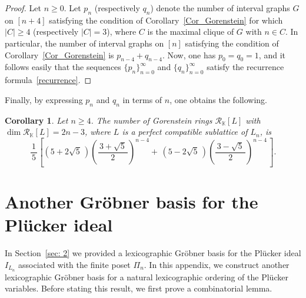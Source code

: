 \documentclass[12pt,a4paper]{amsart}
\def\Rc{{\mathcal R}}
\newtheorem{Corollary}[Theorem]{Corollary}
\theoremstyle{definition}
\begin{document}
\begin{proof}
Let $n \geq 0$.
Let $p_n$ (respectively $q_n$) denote the number of interval graphs $G$ on
$[n+4]$ satisfying the condition of Corollary~\ref{Cor_Gorenstein} for which
$|C| \geq 4$ (respectively $|C| = 3$), where $C$ is the maximal clique of $G$
with $n \in C$.
In particular, the number of interval graphs on $[n]$ satisfying the
condition of Corollary~\ref{Cor_Gorenstein} is $p_{n-4} + q_{n-4}$.
Now, one has $p_0 = q_0 = 1$, and it follows easily that the sequences
$\{p_n\}_{n=0}^\infty$ and $\{q_n\}_{n=0}^\infty$ satisfy the recurrence
formula~\eqref{recurrence}.
\end{proof}

Finally, by expressing $p_n$ and $q_n$ in terms of $n$, one obtains the following.
\begin{Corollary}
  \label{enumeration_2}
  Let $n \geq 4$.  The number of Gorenstein rings $\Rc_\mathbb{K}[L]$ with $\dim \Rc_\mathbb{K}[L] = 2n - 3$, where $L$ is a perfect compatible sublattice of $L_n$, is 
  \[
  \frac{1}{\,5\,}
  \left[
(5+2\sqrt{5}\,)\left(\frac{\,3+\sqrt{5}\,}{2}\right)^{n-4}
  +\,
(5-2\sqrt{5}\,)\left(\frac{\,3-\sqrt{5}\,}{2}\right)^{n-4}\,
  \right].
  \]
\end{Corollary}


  \appendix
\section{Another Gröbner basis for the Plücker ideal} \label{appendix}  
In Section~\ref{sec: 2} we provided a lexicographic Gröbner basis for the Plücker ideal
$I_{L_n}$ associated with the finite poset $\Pi_n$.
In this appendix, we construct another lexicographic Gröbner basis for a
natural lexicographic ordering of the Plücker variables.
Before stating this result, we first prove a combinatorial lemma.

\smallskip
\end{document}
